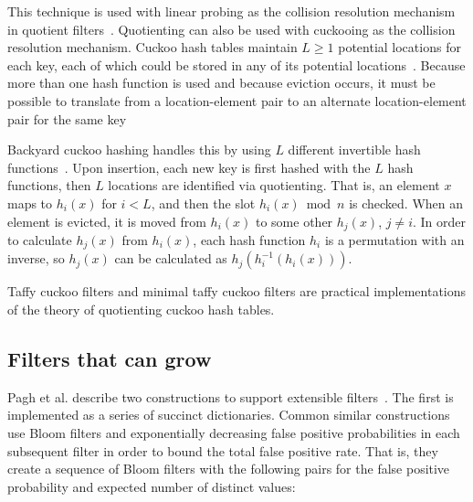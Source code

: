 \documentclass[letterpaper,twocolumn,10pt]{article}
\newcommand{\etal}{et al.}
\begin{document}
This technique is used with linear probing as the collision resolution mechanism in quotient filters~\cite{quotient-filter}.
Quotienting can also be used with cuckooing as the collision resolution mechanism.
Cuckoo hash tables maintain $L \ge 1$ potential locations for each key, each of which could be stored in any of its potential locations~\cite{cuckoo-journal}.
Because more than one hash function is used and because eviction occurs, it must be possible to translate from a location-element pair to an alternate location-element pair for the same key



Backyard cuckoo hashing handles this by using $L$ different invertible hash functions~\cite{backyard}.
Upon insertion, each new key is first hashed with the $L$ hash functions, then $L$ locations are identified via quotienting.
That is, an element $x$ maps to $h_i(x)$ for $i < L$, and then the slot $h_i(x) \bmod n$ is checked.
When an element is evicted, it is moved from $h_i(x)$ to some other $h_j(x)$, $j \ne i$.
In order to calculate $h_j(x)$ from $h_i(x)$, each hash function $h_i$ is a permutation with an inverse, so $h_j(x)$ can be calculated as $h_j(h_i^{-1}(h_i(x)))$.

Taffy cuckoo filters and minimal taffy cuckoo filters are practical implementations of the theory of quotienting cuckoo hash tables.


\subsection{Filters that can grow}

Pagh \etal{} describe two constructions to support extensible filters~\cite{psw}.
The first is implemented as a series of succinct dictionaries.
Common similar constructions use Bloom filters and exponentially decreasing false positive probabilities in each subsequent filter in order to bound the total false positive rate.
That is, they create a sequence of Bloom filters with the following pairs for the false positive probability and expected number of distinct values:
\end{document}
